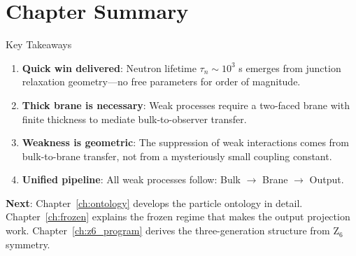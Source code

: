 \section{Chapter Summary}
\label{sec:ch1_summary}

\begin{statusbox}{Key Takeaways}
\begin{enumerate}
\item \textbf{Quick win delivered}: Neutron lifetime $\tau_n \sim 10^3$ s emerges
      from junction relaxation geometry---no free parameters for order of magnitude.

\item \textbf{Thick brane is necessary}: Weak processes require a two-faced brane
      with finite thickness to mediate bulk-to-observer transfer.

\item \textbf{Weakness is geometric}: The suppression of weak interactions comes
      from bulk-to-brane transfer, not from a mysteriously small coupling constant.

\item \textbf{Unified pipeline}: All weak processes follow: Bulk $\to$ Brane $\to$ Output.
\end{enumerate}
\end{statusbox}

\textbf{Next}: Chapter~\ref{ch:ontology} develops the particle ontology in detail.
Chapter~\ref{ch:frozen} explains the frozen regime that makes the output projection work.
Chapter~\ref{ch:z6_program} derives the three-generation structure from Z$_6$ symmetry.
